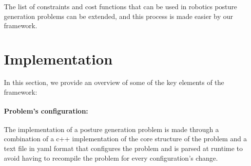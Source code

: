 The list of constraints and cost functions that can be used in robotics posture generation problems can be extended, and this process is made easier by our framework.



\section{Implementation}
\label{sec:implementation}

In this section, we provide an overview of some of the key elements of the framework:

\paragraph{Problem's configuration:}
The implementation of a posture generation problem is made through a combination of a c++ implementation of the core structure of the problem and a text file in yaml format that configures the problem and is parsed at runtime to avoid having to recompile the problem for every configuration's change.

